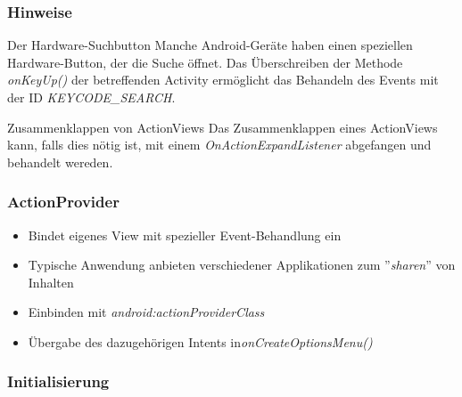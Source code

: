 \begin{frame}
   \frametitle{Hinweise}

   \begin{alertblock}{Der Hardware-Suchbutton}
      Manche Android-Geräte haben einen speziellen Hardware-Button, der die Suche öffnet. 
      Das Überschreiben der Methode \emph{onKeyUp()} der betreffenden Activity 
      ermöglicht das Behandeln des Events mit der ID \emph{KEYCODE\_SEARCH}.
   \end{alertblock}
   
   \begin{alertblock}{Zusammenklappen von ActionViews}
      Das Zusammenklappen eines ActionViews kann, falls dies nötig ist, 
      mit einem \emph{OnActionExpandListener} abgefangen und behandelt wereden.
   \end{alertblock}
\end{frame}

\begin{frame}
   \frametitle{ActionProvider}
   \begin{itemize}
      \item Bindet eigenes View mit spezieller Event-Behandlung ein
      \item Typische Anwendung anbieten verschiedener Applikationen zum ''\emph{sharen}'' 
         von Inhalten
      \item Einbinden mit \emph{android:actionProviderClass}
      \item Übergabe des dazugehörigen Intents in\emph{onCreateOptionsMenu()} 
   \end{itemize}

   
\end{frame}

\begin{frame}
   \frametitle{Initialisierung}
   
\end{frame}

